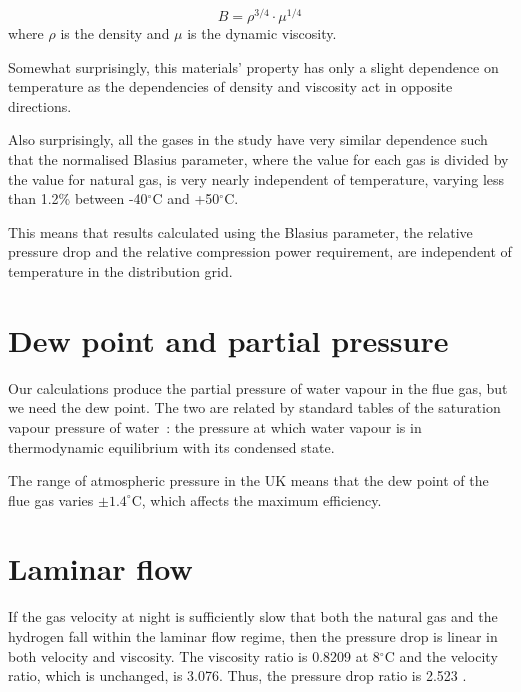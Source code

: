 \documentclass[5p]{elsarticle} %
\begin{document}
\begin{equation}
\label{eqn:defnb}
B =  \rho^{3/4} \cdot \mu^{1/4} 
\end{equation}
where $\rho$ is the density and $\mu$ is the dynamic viscosity.

Somewhat surprisingly, this materials' property has only a slight dependence on  temperature as the dependencies of density and viscosity act in opposite directions. 


Also surprisingly, all the gases in the study have very similar dependence such that the normalised Blasius parameter, where the value for each gas is divided by the value for natural gas, is very nearly independent of temperature, varying less than 1.2\% between -40$^\circ$C and +50$^\circ$C.


This means that results calculated using the Blasius parameter, the relative pressure drop  and the relative compression power requirement, are independent of temperature in the distribution grid.

\section{Dew point and partial pressure}
\label{sec:partial pressure}
Our calculations produce the partial pressure of water vapour in the flue gas, but we need the dew point. The two are related by standard tables of the  saturation vapour pressure of water~\citep{Perry2008}: the pressure at which water vapour is in thermodynamic equilibrium with its condensed state.

The range of atmospheric pressure in the UK means that the dew point of the flue gas varies   $\pm1.4^\circ$C, which affects the maximum efficiency.

\section{Laminar flow}
\label{appendix:laminar}

If the gas velocity at night is sufficiently slow that both the natural gas and the hydrogen fall within the laminar flow regime, then the pressure drop is linear in both velocity and viscosity. The viscosity ratio is 0.8209 at 8$^\circ$C and the velocity ratio, which is unchanged, is 3.076. Thus, the pressure drop ratio is 2.523 .
\end{document}
